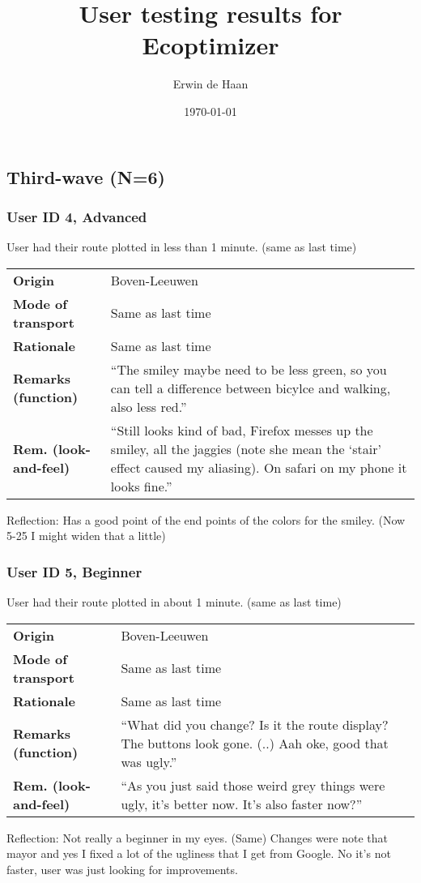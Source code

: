 \documentclass[final,a4paper,11pt]{article}
\author{Erwin de Haan}
\title{User testing results for Ecoptimizer}
\date{\today}
\newlength{\resulttablecolone}
\newlength{\resulttablecoltwo}
\begin{document}
\maketitle

\subsection*{Third-wave (N=6)}
\subsubsection*{User ID 4, Advanced}
User had their route plotted in less than 1 minute. (same as last time)
\begin{table}[H]
\begin{tabular}{p{\resulttablecolone}|p{\resulttablecoltwo}}
\textbf{Origin} & Boven-Leeuwen \\
\textbf{Mode of transport} & Same as last time \\
\textbf{Rationale} & Same as last time \\
\textbf{Remarks (function)} & ``The smiley maybe need to be less green, so you can tell a difference between bicylce and walking, also less red.'' \\
\textbf{Rem. (look-and-feel)} & ``Still looks kind of bad, Firefox messes up the smiley, all the jaggies (note she mean the `stair' effect caused my aliasing). On safari on my phone it looks fine.'' \\
\end{tabular}
\end{table}
Reflection: Has a good point of the end points of the colors for the smiley. (Now 5-25 I might widen that a little)

\subsubsection*{User ID 5, Beginner}
User had their route plotted in about 1 minute. (same as last time)
\begin{table}[H]
\begin{tabular}{p{\resulttablecolone}|p{\resulttablecoltwo}}
\textbf{Origin} & Boven-Leeuwen \\
\textbf{Mode of transport} & Same as last time \\
\textbf{Rationale} & Same as last time \\
\textbf{Remarks (function)} & ``What did you change? Is it the route display? The buttons look gone. (..) Aah oke, good that was ugly.'' \\
\textbf{Rem. (look-and-feel)} & ``As you just said those weird grey things were ugly, it's better now. It's also faster now?'' \\
\end{tabular}
\end{table}
Reflection: Not really a beginner in my eyes. (Same) Changes were note that mayor and yes I fixed a lot of the ugliness that I get from Google. No it's not faster, user was just looking for improvements.
\end{document}

